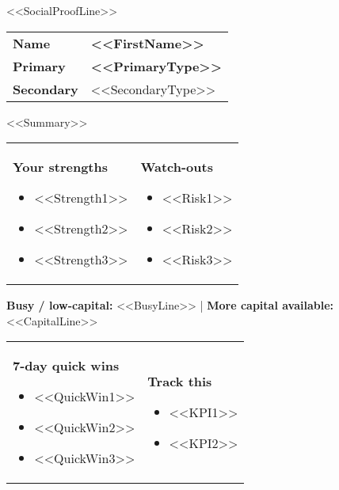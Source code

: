 
{\small \textcolor{textmuted}{<<SocialProofLine>>}}

\begin{tabularx}{\linewidth}{@{} l Y @{}}
\textbf{Name} & \textbf{<<FirstName>>} \\
\textbf{Primary} & \textbf{<<PrimaryType>>} \\
\textbf{Secondary} & <<SecondaryType>> \\
\end{tabularx}

{\small <<Summary>>}

\begin{tabularx}{\linewidth}{@{} Y Y @{}}
\textbf{Your strengths}
\begin{itemize}
  \item <<Strength1>>
  \item <<Strength2>>
  \item <<Strength3>>
\end{itemize}
&
\textbf{Watch-outs}
\begin{itemize}
  \item <<Risk1>>
  \item <<Risk2>>
  \item <<Risk3>>
\end{itemize}
\end{tabularx}

{\small \textbf{Busy / low-capital:} <<BusyLine>> \quad | \quad \textbf{More capital available:} <<CapitalLine>>}

\begin{tabularx}{\linewidth}{@{} Y Y @{}}
\textbf{7-day quick wins}
\begin{itemize}
  \item <<QuickWin1>>
  \item <<QuickWin2>>
  \item <<QuickWin3>>
\end{itemize}
&
\textbf{Track this}
\begin{itemize}
  \item <<KPI1>>
  \item <<KPI2>>
\end{itemize}
\end{tabularx}

